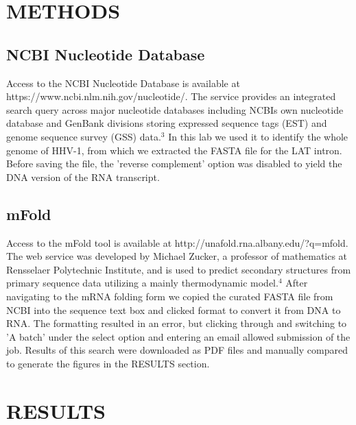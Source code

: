\documentclass[letterpaper, 10 pt, conference]{ieeeconf}  %
\begin{document}
\section{METHODS}

\subsection{NCBI Nucleotide Database}

Access to the NCBI Nucleotide Database is available at https://www.ncbi.nlm.nih.gov/nucleotide/. The service provides an integrated search query across major nucleotide databases including NCBIs own nucleotide database and GenBank divisions storing expressed sequence tags (EST) and genome sequence survey (GSS) data.$^3$ In this lab we used it to identify the whole genome of HHV-1, from which we extracted the FASTA file for the LAT intron. Before saving the file, the 'reverse complement' option was disabled to yield the DNA version of the RNA transcript.

\subsection{mFold}

Access to the mFold tool is available at http://unafold.rna.albany.edu/?q=mfold. The web service was developed by Michael Zucker, a professor of mathematics at Rensselaer Polytechnic Institute, and is used to predict secondary structures from primary sequence data utilizing a mainly thermodynamic model.$^4$ After navigating to the mRNA folding form we copied the curated FASTA file from NCBI into the sequence text box and clicked format to convert it from DNA to RNA. The formatting resulted in an error, but clicking through and switching to 'A batch' under the select option and entering an email allowed submission of the job. Results of this search were downloaded as PDF files and manually compared to generate the figures in the RESULTS section.

\section{RESULTS}
\end{document}
